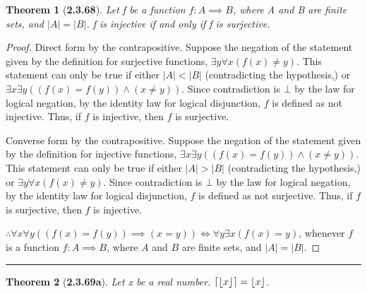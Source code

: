 \documentclass[a4paper, 12pt]{article}
\theoremstyle{plain}
\newtheorem*{theorem*}{Theorem}
\DeclarePairedDelimiter{\floor}{\lfloor}{\rfloor}
\DeclarePairedDelimiter{\ceil}{\lceil}{\rceil}
\begin{document}
\pagebreak


\begin{theorem*}[\textbf{2.3.68}]
    Let f be a function $f: A \implies B$, where A and B are finite sets, and $|A| = |B|$. f 
    is injective if and only if f is surjective.
\end{theorem*}

\begin{proof}
    Direct form by the contrapositive. Suppose the negation of the \newline statement given by 
    the definition for surjective functions, $\exists y \forall x (f(x) \ne y)$. This statement 
    can only be true if either $|A| < |B|$ (contradicting the \newline hypothesis,) or $\exists 
    x \exists y ((f(x) = f(y)) \land (x \ne y))$. Since contradiction is $\bot$ by the law for 
    logical negation, by the identity law for logical disjunction, $f$ is defined as not 
    injective. Thus, if $f$ is injective, then $f$ is surjective.
    
    Converse form by the contrapositive. Suppose the negation of the \newline statement given 
    by the definition for injective functions, \newline 
    $\exists x \exists y ((f(x) = f(y)) \land (x \ne y))$. 
    This statement can only be true if either $|A| > |B|$ (contradicting the hypothesis,) or 
    $\exists y \forall x (f(x) \ne y)$. Since \newline contradiction is $\bot$ by the law for 
    logical negation, by the identity law for logical disjunction, $f$ is defined as not 
    surjective. Thus, if $f$ is surjective, then $f$ is injective.
    
    $\therefore \forall x \forall y ((f(x) = f(y)) \implies 
    (x = y)) \iff \forall y \exists x (f(x) = y)$, whenever $f$ is a function $f: A \implies B$, 
    where $A$ and $B$ are finite sets, and $|A| = |B|$.
\end{proof}
\begin{center}
    \rule{5.4in}{1pt}
\end{center}


\begin{theorem*}[\textbf{2.3.69a}]
    Let x be a real number. $\ceil{\floor{x}} = \floor{x}$.
\end{theorem*}
\end{document}
